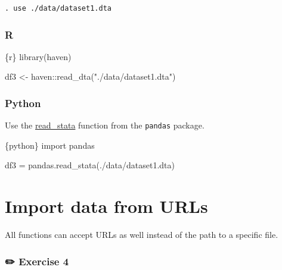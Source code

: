 \documentclass[
  letterpaper,
  DIV=11,
  numbers=noendperiod]{scrreprt}
\newenvironment{Shaded}{\begin{snugshade}}{\end{snugshade}}
\newcommand{\FunctionTok}[1]{\textcolor[rgb]{0.28,0.35,0.67}{#1}}
\newcommand{\ImportTok}[1]{\textcolor[rgb]{0.00,0.46,0.62}{#1}}
\newcommand{\InformationTok}[1]{\textcolor[rgb]{0.37,0.37,0.37}{#1}}
\newcommand{\NormalTok}[1]{\textcolor[rgb]{0.00,0.23,0.31}{#1}}
\newcommand{\OperatorTok}[1]{\textcolor[rgb]{0.37,0.37,0.37}{#1}}
\newcommand{\OtherTok}[1]{\textcolor[rgb]{0.00,0.23,0.31}{#1}}
\newcommand{\SpecialCharTok}[1]{\textcolor[rgb]{0.37,0.37,0.37}{#1}}
\newcommand{\StringTok}[1]{\textcolor[rgb]{0.13,0.47,0.30}{#1}}
\begin{document}
\begin{verbatim}
. use ./data/dataset1.dta
\end{verbatim}

\hypertarget{r-2}{%
\subsubsection{R}\label{r-2}}

\begin{Shaded}
\begin{Highlighting}[]
\InformationTok{\textasciigrave{}\textasciigrave{}\textasciigrave{}\{r\}}
\FunctionTok{library}\NormalTok{(haven)}

\NormalTok{df3 }\OtherTok{\textless{}{-}}\NormalTok{ haven}\SpecialCharTok{::}\FunctionTok{read\_dta}\NormalTok{(}\StringTok{"./data/dataset1.dta"}\NormalTok{)}
\InformationTok{\textasciigrave{}\textasciigrave{}\textasciigrave{}}
\end{Highlighting}
\end{Shaded}

\hypertarget{python-2}{%
\subsubsection{Python}\label{python-2}}

Use the
\href{https://pandas.pydata.org/docs/reference/api/pandas.read_stata.html}{read\_stata}
function from the \texttt{pandas} package.

\begin{Shaded}
\begin{Highlighting}[]
\InformationTok{\textasciigrave{}\textasciigrave{}\textasciigrave{}\{python\}}
\ImportTok{import}\NormalTok{ pandas}

\NormalTok{df3 }\OperatorTok{=}\NormalTok{ pandas.read\_stata(}\StringTok{\textquotesingle{}./data/dataset1.dta\textquotesingle{}}\NormalTok{)}
\InformationTok{\textasciigrave{}\textasciigrave{}\textasciigrave{}}
\end{Highlighting}
\end{Shaded}

\hypertarget{import-data-from-urls}{%
\section{Import data from URLs}\label{import-data-from-urls}}

All functions can accept URLs as well instead of the path to a specific
file.

\hypertarget{exercise-4}{%
\subsubsection{\texorpdfstring{{✏️} Exercise
4}{✏️ Exercise 4}}\label{exercise-4}}
\end{document}
